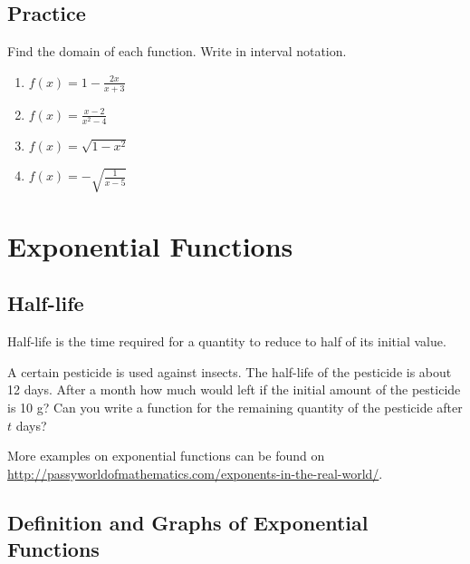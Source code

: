 \documentclass[
  en,11pt]{elegantbook}
\providecommand{\tightlist}{%
  \setlength{\itemsep}{0pt}\setlength{\parskip}{0pt}}
\newcommand{\size}[2]{{\fontsize{#1}{0}\selectfont#2}}
\renewenvironment{exercise}[1][]{
    \refstepcounter{exer}
    \par\noindent
    \makebox[-3pt][r]{\color{red!90}\size{12}{\HandPencilLeft}}
	\textbf{\color{main}{\exercisename} \theexer #1}
    \rmfamily
}{\par\ignorespacesafterend}
\newenvironment{rmdthink}{
	\vspace*{0.5\baselineskip}
	\par\noindent
	\makebox[-4pt][r]{\color{green!90}\size{12}{\faLightbulbO}\,\,}
    \begin{tcolorbox}[
    enhanced,
    title={\textbf{\color{second}Think}},
    title style={left color=blue!10!green!20!white,right color=yellow!20!blue!20!white},
    colback=green!20!white,
    ]
    \sffamily
}{
    \end{tcolorbox}
	\par\ignorespacesafterend
}
\begin{document}
\hypertarget{practice-14}{%
\section{Practice}\label{practice-14}}

\begin{exercise}

Find the domain of each function. Write in interval notation.

\begin{enumerate}
\def\labelenumi{\arabic{enumi}.}
\tightlist
\item
  \(f(x)=1-\frac{2x}{x+3}\)
\item
  \(f(x)=\frac{x-2}{x^2-4}\)
\item
  \(f(x)=\sqrt{1-x^2}\)
\item
  \(f(x)=-\sqrt{\frac{1}{x-5}}\)
\end{enumerate}

\end{exercise}

\hypertarget{exponential-functions}{%
\chapter{Exponential Functions}\label{exponential-functions}}

\hypertarget{half-life}{%
\section{Half-life}\label{half-life}}

\begin{rmdthink}

Half-life is the time required for a quantity to reduce to half of its initial value.

A certain pesticide is used against insects. The half-life of the pesticide is about 12 days. After a month how much would left if the initial amount of the pesticide is 10 g? Can you write a function for the remaining quantity of the pesticide after \(t\) days?

\end{rmdthink}

More examples on exponential functions can be found on \url{http://passyworldofmathematics.com/exponents-in-the-real-world/}.

\hypertarget{definition-and-graphs-of-exponential-functions}{%
\section{Definition and Graphs of Exponential Functions}\label{definition-and-graphs-of-exponential-functions}}
\end{document}
